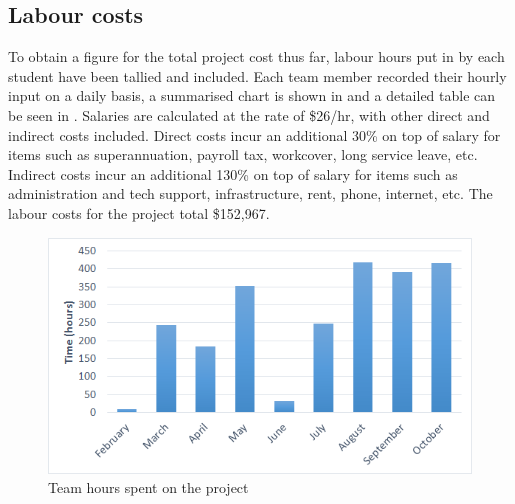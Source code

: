 \documentclass[main.tex]{subfiles}
\begin{document}
\subsection{Labour costs}
To obtain a figure for the total project cost thus far, labour hours put in by each student have been tallied and included.  Each team member recorded their hourly input on a daily basis, a summarised chart is shown in  and a detailed table can be seen in . Salaries are calculated at the rate of \$26/hr, with other direct and indirect costs included. Direct costs incur an additional 30\% on top of salary for items such as superannuation, payroll tax, workcover, long service leave, etc. Indirect costs incur an additional 130\% on top of salary for items such as administration and tech support, infrastructure, rent, phone, internet, etc. The labour costs for the project total \$152,967.
\begin{figure}[ht]
\centering
\includegraphics[]{6-ProjectManagement/teamhours.png}
\caption[]{Team hours spent on the project}
\end{figure}
\end{document}
